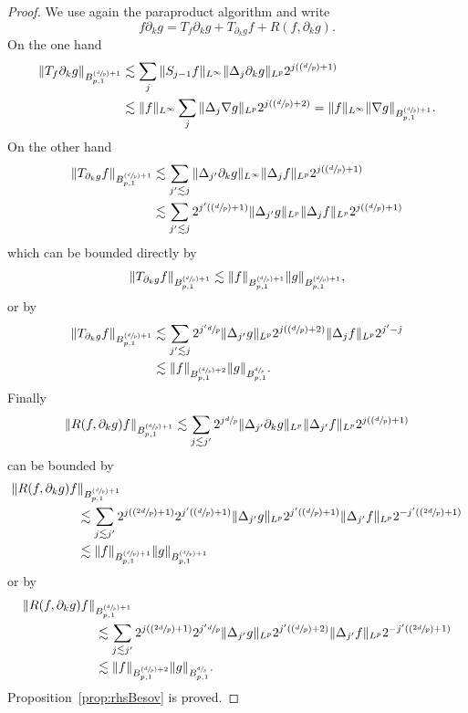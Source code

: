 \documentclass[10pt]{amsart}
\newcommand{\Psfrac}[2]{(\sfrac{#1}{#2})}
\theoremstyle{definition}
\begin{document}
\begin{proof}
We use again the paraproduct algorithm and write
\[
f \partial_k g = T_f \partial_k g + T_{\partial_k g }f + R(f,\partial_k g).
\]
On the one hand
\[
\begin{aligned}
\|T_f \partial_k g\|_{ B^{\Psfrac dp+1}_{p,1}} &\lesssim \sum_j \|S_{j-1}f\|_{L^\infty } \|\Delta_j \partial_k g\|_{ L^p}2^{j (\Psfrac dp+1)}\\
&\lesssim\| f\|_{L^\infty } \sum_j \|\Delta_j \nabla g\|_{L^p}2^{j (\Psfrac dp+2)} = \|f\|_{L^\infty} \|\nabla g\|_{ B^{\Psfrac dp+1	}_{p,1}}.
\end{aligned}
\]
On the other hand
\[
\begin{aligned}
\|T_{ \partial_k g} f \|_{ B^{\Psfrac dp+1}_{p,1}} &\lesssim \sum_{j'\lesssim j } \|\Delta_{j'} \partial_k g\|_{L^\infty }\|\Delta_j f\|_{L^p } 2^{j (\Psfrac dp+1)}\\
&\lesssim\sum_{j'\lesssim j }2^{j'(\Psfrac dp+1)} \|\Delta_{j'} g\|_{ L^p} \|\Delta_j f\|_{ L^p }2^{j (\Psfrac dp+1)}
\end{aligned}
\]
which can be bounded directly by
\[
\|T_{ \partial_k g} f \|_{ B^{\Psfrac dp+1}_{p,1}}\lesssim \| f\|_{B^{\Psfrac dp+1}_{p,1}} \|g\|_{B^{\Psfrac dp+1}_{p,1}},
\]
or by
\[
\begin{aligned}
\|T_{ \partial_k g} f \|_{ B^{\Psfrac dp+1}_{p,1}} &\lesssim
\sum_{j'\lesssim j } 2^{j'\sfrac dp} \|\Delta_{j'} g\|_{ L^p} 2^{j (\Psfrac dp+2)} \|\Delta_j f\|_{ L^p }2^{j'-j} \\
&\lesssim\| f\|_{B^{\Psfrac dp+2}_{p,1}} \|g\|_{ B^{\sfrac dp}_{p,1}}.
\end{aligned}
\]
Finally
\[
\|R(f,\partial_k g) f \|_{ B^{\Psfrac dp+1}_{p,1}} \lesssim
\sum_{j\lesssim j'} 2^{j \sfrac dp } \|\Delta_{j'} \partial_k g \|_{ L^p} \|\Delta_{j'} f\|_{ L^p }2^{j (\Psfrac dp+1)}
\]
can be bounded by
\[
\begin{aligned}
\|R(f,\partial_k g) f &\|_{ B^{\Psfrac dp+1}_{p,1}}\\
&\lesssim \sum_{j\lesssim j'} 2^{j (\Psfrac {2d}p+1) } 2^{j' (\Psfrac dp+1) } \|\Delta_{j'} g \|_{ L^p} 2^{j' (\Psfrac dp+1) }\|\Delta_{j'} f\|_{L^p } 2^{-j'(\Psfrac {2d}p+1)}\\
&\lesssim\| f\|_{B^{\Psfrac dp+1}_{p,1}} \|g\|_{ B^{\Psfrac dp+1}_{p,1}}
\end{aligned}
\]
or by
\[
\begin{aligned}
\|R(f,\partial_k g) f \|&_{ B^{\Psfrac dp+1}_{p,1}}\\
&\lesssim \sum_{j\lesssim j'} 2^{j (\Psfrac {2d}p+1) } 2^{j' \sfrac dp } \|\Delta_{j'} g \|_{ L^p} 2^{j' (\Psfrac dp+2) }\|\Delta_{j'} f\|_{L^p } 2^{-j'(\Psfrac {2d}p+1)}\\
&\lesssim\| f\|_{B^{\Psfrac dp+2}_{p,1}} \|g\|_{ B^{\sfrac dp}_{p,1}}.\end{aligned}
\]
Proposition~\ref{prop:rhsBesov} is proved.
\end{proof}
\end{document}
